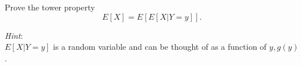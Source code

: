 Prove the tower property
\[
    E[X] = E\left[E[X|Y=y]\right].
\]

\textit{Hint}:\\
$E[X|Y=y]$ is a random variable and can be thought of as a function of $y, g(y)$.

\smallspace

